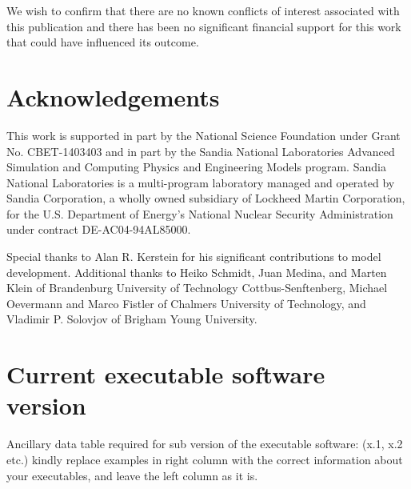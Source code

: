 \documentclass[preprint,12pt, a4paper]{elsarticle}
\begin{document}
We wish to confirm that there are no known conflicts of interest associated with this publication and there has been no significant financial support for this work that could have influenced its outcome.

\section*{Acknowledgements}
\label{acknoledgements}

This work is supported in part by the National Science Foundation under Grant No. CBET-1403403
and in part by the Sandia National Laboratories Advanced Simulation and Computing Physics and
Engineering Models program. Sandia National Laboratories is a multi-program laboratory
managed and operated by Sandia Corporation, a wholly owned subsidiary of Lockheed Martin
Corporation, for the U.S. Department of Energy’s National Nuclear Security Administration
under contract DE-AC04-94AL85000. 

Special thanks to Alan R. Kerstein for his significant contributions to model development. Additional thanks to Heiko Schmidt, Juan Medina, and Marten Klein of Brandenburg University of Technology Cottbus-Senftenberg, Michael Oevermann and Marco Fistler of Chalmers University of Technology, and Vladimir P. Solovjov of Brigham Young University.




 
 

\section*{Current executable software version}
\label{software_version}

Ancillary data table required for sub version of the executable software: (x.1, x.2 etc.) kindly replace examples in right column with the correct information about your executables, and leave the left column as it is.
\end{document}
